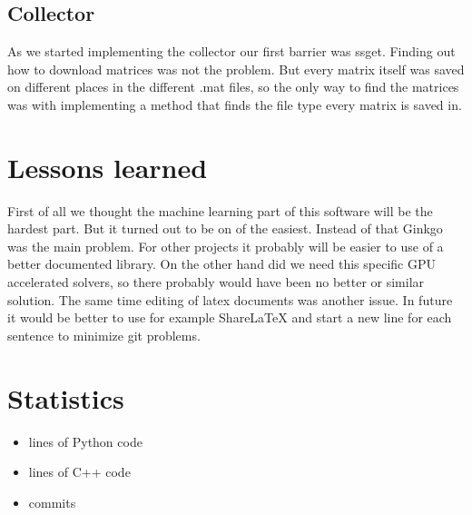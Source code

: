 \documentclass[parskip=full]{scrartcl}
\begin{document}
\subsection{Collector}
As we started implementing the collector our first barrier was \gls{ssget}. 
Finding out how to download matrices was not the problem.
But every matrix itself was saved on different places in the different .mat files, so the only way to find the matrices was with implementing a method that finds the file type every matrix is saved in.

\section{Lessons learned}
First of all we thought the machine learning part of this software will be the hardest part.
But it turned out to be on of the easiest.
Instead of that \gls{Ginkgo} was the main problem.
For other projects it probably will be easier to use of a better documented library.
On the other hand did we need this specific GPU accelerated solvers, so there probably would have been no better or similar solution.
The same time editing of latex documents was another issue.
In future it would be better to use for example ShareLaTeX and start a new line for each sentence to minimize git problems.

\section{Statistics}
 
\begin{itemize}

\item lines of Python code

\item lines of C++ code

\item commits

\end{itemize}
\end{document}
